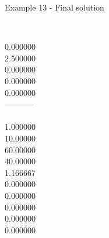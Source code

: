 \begin{frame}{Example 13 - Final solution}
\begin{columns}[t]
\begin{column}{0.3\textwidth}
\\
0.000000\\
2.500000\\
0.000000\\
0.000000\\
0.000000\\
-----------\\
\\
1.000000\\
10.00000\\
60.00000\\
40.00000\\
1.166667\\
0.000000\\
0.000000\\
0.000000\\
0.000000\\
0.000000\\
\end{column}
\end{columns}
\end{frame}
